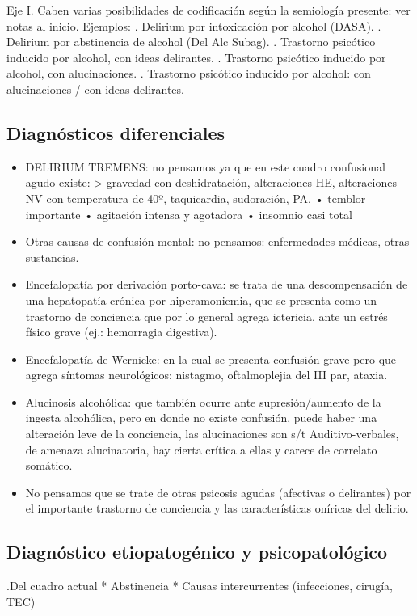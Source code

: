 \documentclass{scrbook}
\begin{document}
Eje I. Caben varias posibilidades de codificación según la semiología presente: ver notas al inicio. Ejemplos: . Delirium por intoxicación por alcohol (DASA). . Delirium por abstinencia de alcohol (Del Alc Subag). . Trastorno psicótico inducido por alcohol, con ideas delirantes. . Trastorno psicótico inducido por alcohol, con alucinaciones. . Trastorno psicótico inducido por alcohol: con alucinaciones / con ideas delirantes.

\subsection*{Diagnósticos diferenciales}
\begin{itemize}
\item DELIRIUM TREMENS: no pensamos ya que en este cuadro confusional agudo existe: > gravedad con deshidratación, alteraciones HE, alteraciones NV con temperatura de 40º, taquicardia, sudoración, PA. • temblor importante • agitación intensa y agotadora • insomnio casi total
\item Otras causas de confusión mental: no pensamos: enfermedades médicas, otras sustancias.
\item Encefalopatía por derivación porto-cava: se trata de una descompensación de una hepatopatía crónica por hiperamoniemia, que se presenta como un trastorno de conciencia que por lo general agrega ictericia, ante un estrés físico grave (ej.: hemorragia digestiva).
\item Encefalopatía de Wernicke: en la cual se presenta confusión grave pero que agrega síntomas neurológicos: nistagmo, oftalmoplejia del III par, ataxia.
\item Alucinosis alcohólica: que también ocurre ante supresión/aumento de la ingesta alcohólica, pero en donde no existe confusión, puede haber una alteración leve de la conciencia, las alucinaciones son s/t Auditivo-verbales, de amenaza alucinatoria, hay cierta crítica a ellas y carece de correlato somático.
\item No pensamos que se trate de otras psicosis agudas (afectivas o delirantes) por el importante trastorno de conciencia y las características oníricas del delirio.
\end{itemize}
\subsection*{Diagnóstico etiopatogénico y psicopatológico}

.Del cuadro actual
* Abstinencia
* Causas intercurrentes (infecciones, cirugía, TEC)
\end{document}
